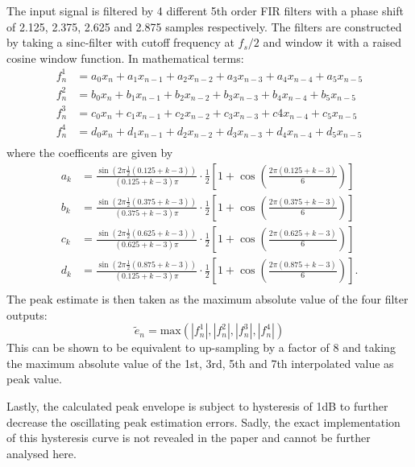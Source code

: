 \documentclass[../main2.tex]{subfiles}
\begin{document}
The input signal is filtered by 4 different 5th order FIR filters with a phase shift of 2.125, 2.375, 2.625 and 2.875 samples respectively. The filters are constructed by taking a sinc-filter with cutoff frequency at $f_s/2$ and window it with a raised cosine window function. In mathematical terms:
\begin{equation}
\begin{split}
f^1_n &= a_0 x_{n} + a_1 x_{n-1} + a_2 x_{n-2} + a_3 x_{n-3} + a_4 x_{n-4} + a_5 x_{n-5} \\
f^2_n &= b_0 x_{n} + b_1 x_{n-1} + b_2 x_{n-2} + b_3 x_{n-3} + b_4 x_{n-4} + b_5 x_{n-5} \\
f^3_n &= c_0 x_{n} + c_1 x_{n-1} + c_2 x_{n-2} + c_3 x_{n-3} + c4 x_{n-4} + c_5 x_{n-5} \\
f^4_n &= d_0 x_{n} + d_1 x_{n-1} + d_2 x_{n-2} + d_3 x_{n-3} + d_4 x_{n-4} + d_5 x_{n-5} \\
\end{split}
\end{equation}
where the coefficents are given by
\begin{equation}
\begin{split}
a_k &= \frac{\sin (2 \pi \frac{1}{2} (0.125+k-3) )}{(0.125+k-3)\pi} \cdot \frac{1}{2}\left[1+\cos \left(\frac{2 \pi (0.125+k-3)}{6} \right) \right] \\
b_k &= \frac{\sin (2 \pi \frac{1}{2} (0.375+k-3) )}{(0.375+k-3)\pi} \cdot \frac{1}{2}\left[1+\cos \left(\frac{2 \pi (0.375+k-3)}{6} \right) \right] \\
c_k &= \frac{\sin (2 \pi \frac{1}{2} (0.625+k-3) )}{(0.625+k-3)\pi} \cdot \frac{1}{2}\left[1+\cos \left(\frac{2 \pi (0.625+k-3)}{6} \right) \right] \\
d_k &= \frac{\sin (2 \pi \frac{1}{2} (0.875+k-3) )}{(0.125+k-3)\pi} \cdot \frac{1}{2}\left[1+\cos \left(\frac{2 \pi (0.875+k-3)}{6} \right) \right]. \\
\end{split}
\end{equation}
The peak estimate is then taken as the maximum absolute value of the four filter outputs:
\begin{equation}
\tilde{e}_n = \text{max}(|f^1_n|, |f^2_n|, |f^3_n|, |f^4_n|)
\end{equation}
This can be shown to be equivalent to up-sampling by a factor of 8 and taking the maximum absolute value of the 1st, 3rd, 5th and 7th interpolated value as peak value. 

Lastly, the calculated peak envelope is subject to hysteresis of 1dB to further decrease the oscillating peak estimation errors. Sadly, the exact implementation of this hysteresis curve is not revealed in the paper and cannot be further analysed here.
\end{document}
